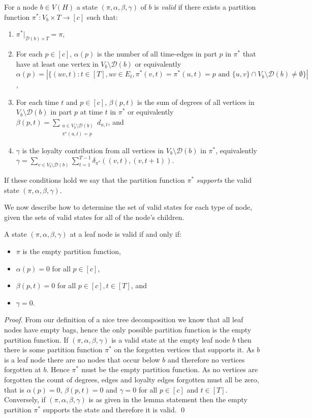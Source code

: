 \documentclass[runningheads]{llncs}
\begin{document}
For a node $b \in V(H)$ a state $(\pi,\alpha,\beta,\gamma)$ of $b$ is \emph{valid} if there exists a partition function $\pi^*:V_b\times T \rightarrow [c]$ such that:
\begin{enumerate}
\item $\pi^*| _{\mathcal{D}(b)\times T}=\pi$,
    \item For each $p \in [c]$,  $\alpha(p)$ is the number of all time-edges in part $p$ in $\pi^*$ that have at least one vertex in $V_b \setminus \mathcal{D}(b)$ or equivalently $\alpha(p)=|\{(uv,t):t\in[T],uv\in E_t,\pi^*(v,t)=\pi^*(u,t)=p \text{ and } \{u,v\}\cap V_b \setminus \mathcal{D}(b)\neq \emptyset \}|$, 
    \item For each time $t$ and $p \in [c]$, $ \beta(p,t)$ is the sum of degrees of all vertices in $V_b \setminus \mathcal{D}(b)$ in part $p$ at time $t$ in $\pi^*$ or equivalently $\beta(p,t)=\sum_{\substack{u\in V_b \setminus \mathcal{D}(b)\\\pi^*(u,t)=p}} d_{u,t}$, and
    \item $\gamma$ is the loyalty contribution from all vertices in $V_b \setminus \mathcal{D}(b)$ in $\pi^*$, equivalently  $\gamma= \sum_{v \in V_b \setminus \mathcal{D}(b)} \sum_{t=1}^{T-1} \delta_{\pi^*}((v,t),(v,t+1))$.
\end{enumerate}
If these conditions hold we say that the partition function $\pi^*$ \emph{supports} the valid state $(\pi,\alpha,\beta,\gamma)$.  

We now describe how to determine the set of valid states for each type of node, given the sets of valid states for all of the node's children.

\begin{lemma} \label{lem:tw leaf}
    A state $(\pi,\alpha,\beta,\gamma)$ at a leaf node is valid if and only if:
    \begin{itemize}
        \item $\pi$ is the empty partition function,
        \item $\alpha(p)=0$ for all $p\in[c]$,
        \item $\beta(p,t)=0$ for all $p \in [c],t\in[T]$, and
        \item $\gamma=0$.
    \end{itemize}
\end{lemma}
\begin{proof}
From our definition of a nice tree decomposition we know that all leaf nodes have empty bags, hence the only possible partition function is the empty partition function.
If $(\pi,\alpha,\beta,\gamma)$ is a valid state at the empty leaf node $b$ then there is some partition function $\pi^*$ on the forgotten vertices that supports it. As $b$ is a leaf node there are no nodes that occur below $b$ and therefore no vertices forgotten at $b$. Hence $\pi^*$ must be the empty partition function. As no vertices are forgotten the count of degrees, edges and loyalty edges forgotten must all be zero, that is $\alpha(p)=0$, $\beta(p,t)=0$ and $\gamma=0$ for all $p\in[c]$ and $t\in[T]$.
Conversely, if $(\pi,\alpha,\beta,\gamma)$ is as given in the lemma statement then the empty partition $\pi^*$ supports the state and therefore it is valid.
\qed 
\end{proof}
\end{document}
